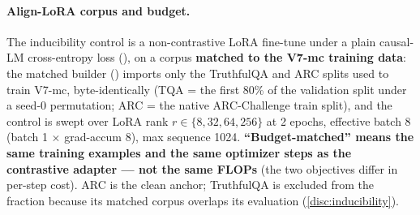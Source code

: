 \paragraph{Align-LoRA corpus and budget.}
The inducibility control is a non-contrastive LoRA fine-tune under a plain
causal-LM cross-entropy loss (), on a corpus
\textbf{matched to the V7-mc training data}: the matched builder
() imports only the TruthfulQA and
ARC splits used to train V7-mc, byte-identically (TQA = the first 80\% of the
validation split under a seed-0 permutation; ARC = the native ARC-Challenge train
split), and the control is swept over LoRA rank $r \in \{8, 32, 64, 256\}$ at 2
epochs, effective batch 8 (batch 1 $\times$ grad-accum 8), max sequence 1024.
\textbf{``Budget-matched'' means the same training examples and the same optimizer
steps as the contrastive adapter --- not the same FLOPs} (the two objectives differ
in per-step cost). ARC is the clean anchor; TruthfulQA is excluded from the fraction
because its matched corpus overlaps its evaluation (\cref{disc:inducibility}).
